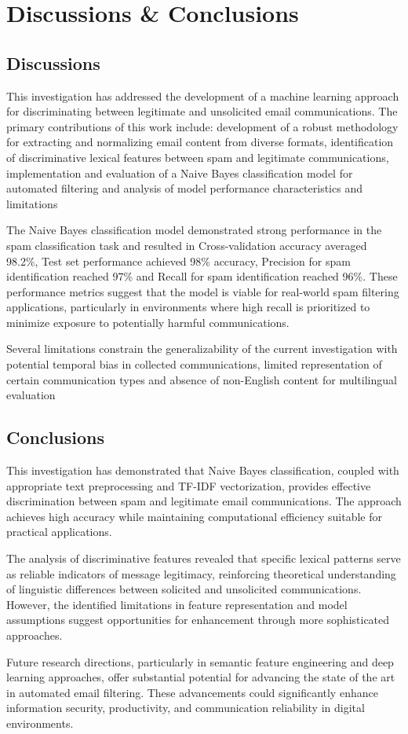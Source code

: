 \chapter{Discussions \& Conclusions}

\section{Discussions}
This investigation has addressed the development of a machine learning approach for discriminating between legitimate and unsolicited email communications. The primary contributions of this work include:
development of a robust methodology for extracting and normalizing email content from diverse formats, 
identification of discriminative lexical features between spam and legitimate communications, 
implementation and evaluation of a Naive Bayes classification model for automated filtering and 
analysis of model performance characteristics and limitations

The Naive Bayes classification model demonstrated strong performance in the spam classification task and resulted in Cross-validation accuracy averaged 98.2\%, Test set performance achieved 98\% accuracy, Precision for spam identification reached 97\% and Recall for spam identification reached 96\%.
These performance metrics suggest that the model is viable for real-world spam filtering applications, particularly in environments where high recall is prioritized to minimize exposure to potentially harmful communications.

Several limitations constrain the generalizability of the current investigation with potential temporal bias in collected communications, 
limited representation of certain communication types and 
absence of non-English content for multilingual evaluation

\section{Conclusions}
This investigation has demonstrated that Naive Bayes classification, coupled with appropriate text preprocessing and TF-IDF vectorization, provides effective discrimination between spam and legitimate email communications. The approach achieves high accuracy while maintaining computational efficiency suitable for practical applications.

The analysis of discriminative features revealed that specific lexical patterns serve as reliable indicators of message legitimacy, reinforcing theoretical understanding of linguistic differences between solicited and unsolicited communications. However, the identified limitations in feature representation and model assumptions suggest opportunities for enhancement through more sophisticated approaches.

Future research directions, particularly in semantic feature engineering and deep learning approaches, offer substantial potential for advancing the state of the art in automated email filtering. These advancements could significantly enhance information security, productivity, and communication reliability in digital environments. 